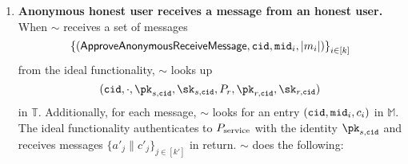 \begin{enumerate}

	\item \textbf{Anonymous honest user receives a message from an honest user.} When $\sim$ receives a set of messages { \small $$ \left\{(\mathsf{ApproveAnonymousReceiveMessage}, \mathtt{cid}, \mathtt{mid}_i, |m_i|)\right\}_{i\in[k]}$$} from the ideal functionality, $\sim$ looks up $$(\convoid, \cdot, \pk_{s,\convoid}, \sk_{s,\convoid}, P_r, \pk_{r,\convoid}, \sk_{r,\convoid})$$ in $\mathbb{T}.$ Additionally, for each message, $\sim$ looks for an entry $(\mathtt{cid}, \mathtt{mid}_i, c_i)$ in $\mathbb{M}.$  The ideal functionality authenticates to $P_{\text{service}}$ with the identity $\pk_{s,\convoid}$ and receives messages $\{a'_j \| c'_j\}_{j\in[k']}$ in return. $\sim$ does the following:


\end{enumerate}
